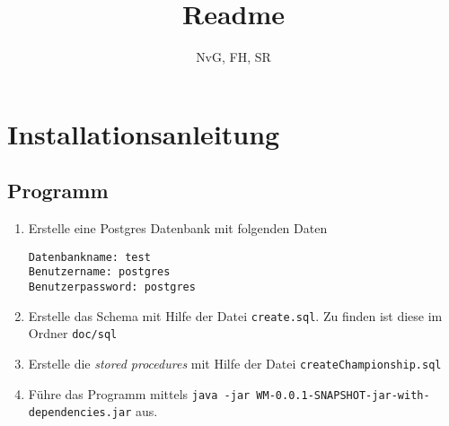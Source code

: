 \documentclass[11pt,german]{scrartcl}
\title{Readme}
\author{NvG, FH, SR}
\date{}
\begin{document}
\renewcommand{\labelenumi}{\alph{enumi})}
\renewcommand{\labelenumii}{$\bullet$}





\maketitle


\section*{Installationsanleitung}
\subsection*{Programm}
\begin{enumerate}
\item Erstelle eine Postgres Datenbank mit folgenden Daten
\begin{verbatim}Datenbankname: test
Benutzername: postgres
Benutzerpassword: postgres\end{verbatim}

\item Erstelle das Schema mit Hilfe der Datei {\tt create.sql}. Zu finden ist diese im Ordner {\tt doc/sql}

\item Erstelle die {\it stored procedures} mit Hilfe der Datei {\tt createChampionship.sql}

\item Führe das Programm mittels {\tt java -jar WM-0.0.1-SNAPSHOT-jar-with-dependencies.jar} aus.
\end{enumerate}
\end{document}
